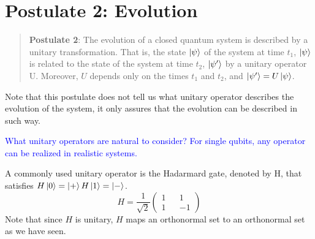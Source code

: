 \section{Postulate 2: Evolution}

\begin{quote}
    \textbf{Postulate 2}: The evolution of a closed quantum system is described by a unitary transformation. That is, the state $\ket{\psi}$ of the system at time $t_1$, $\ket{\psi}$ is related to the state of the system at time $t_2$, $\ket{\psi'}$ by a unitary operator U.  Moreover, $U$ depends only on the times $t_1$ and $t_2$, and $\ket{\psi'}=U\ket{\psi}$.
\end{quote}

Note that this postulate does not tell us what unitary operator describes the evolution of the system, it only assures that the evolution can be described in such way. 

\textcolor{blue}{What unitary operators are natural to consider?  For single qubits, any operator can be realized in realistic systems.}

\begin{example} 
A commonly used unitary operator is the Hadarmard gate, denoted by H, that satisfies $H\ket{0}=\ket{+}\\
H\ket{1}=\ket{-}$.
\begin{equation}
   H=\frac{1}{\sqrt{2}}\begin{pmatrix}
1 && 1\\
1 && -1
\end{pmatrix} 
\end{equation}
Note that since $H$ is unitary, $H$ maps an orthonormal set to an orthonormal set as we have seen.
\end{example}


